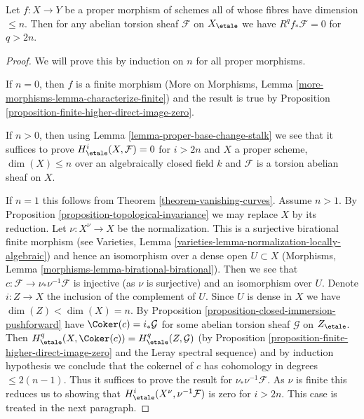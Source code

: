 \begin{lemma}
\label{lemma-cohomological-dimension-proper}
Let $f : X \to Y$ be a proper morphism of schemes
all of whose fibres have dimension $\leq n$.
Then for any abelian torsion sheaf $\mathcal{F}$ on $X_\etale$
we have $R^qf_*\mathcal{F} = 0$ for $q > 2n$.
\end{lemma}

\begin{proof}
We will prove this by induction on $n$ for all proper morphisms.

\medskip\noindent
If $n = 0$, then $f$ is a finite morphism
(More on Morphisms, Lemma \ref{more-morphisms-lemma-characterize-finite})
and the
result is true by Proposition \ref{proposition-finite-higher-direct-image-zero}.

\medskip\noindent
If $n > 0$, then using Lemma \ref{lemma-proper-base-change-stalk}
we see that it suffices to prove $H^i_\etale(X, \mathcal{F}) = 0$
for $i > 2n$ and $X$ a proper scheme, $\dim(X) \leq n$
over an algebraically closed field $k$
and $\mathcal{F}$ is a torsion abelian sheaf on $X$.

\medskip\noindent
If $n = 1$ this follows from Theorem \ref{theorem-vanishing-curves}.
Assume $n > 1$. By Proposition \ref{proposition-topological-invariance}
we may replace $X$ by its reduction.
Let $\nu : X^\nu \to X$ be the normalization.
This is a surjective birational finite morphism
(see Varieties, Lemma \ref{varieties-lemma-normalization-locally-algebraic})
and hence an isomorphism over a dense open $U \subset X$
(Morphisms, Lemma \ref{morphisms-lemma-birational-birational}).
Then we see that
$c : \mathcal{F} \to \nu_*\nu^{-1}\mathcal{F}$ is injective
(as $\nu$ is surjective) and an isomorphism over $U$.
Denote $i : Z \to X$ the inclusion of the complement of $U$.
Since $U$ is dense in $X$ we have $\dim(Z) < \dim(X) = n$.
By Proposition \ref{proposition-closed-immersion-pushforward} have
$\Coker(c) = i_*\mathcal{G}$ for some
abelian torsion sheaf $\mathcal{G}$ on $Z_\etale$.
Then $H^q_\etale(X, \Coker(c)) = H^q_\etale(Z, \mathcal{G})$
(by Proposition \ref{proposition-finite-higher-direct-image-zero}
and the Leray spectral sequence) and by induction hypothesis we conclude that
the cokernel of $c$ has cohomology in degrees $\leq 2(n - 1)$.
Thus it suffices to prove the result for $\nu_*\nu^{-1}\mathcal{F}$.
As $\nu$ is finite this reduces us to showing
that $H^i_\etale(X^\nu, \nu^{-1}\mathcal{F})$ is
zero for $i > 2n$. This case is treated in the next paragraph.


\end{proof}
